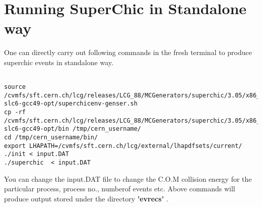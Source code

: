 \documentclass[11pt]{article}
\begin{document}
\section{Running SuperChic in Standalone way}

One can directly carry out following commands in the fresh terminal to produce superchic events in standalone way.

\begin{tiny}
\begin{verbatim}

source /cvmfs/sft.cern.ch/lcg/releases/LCG_88/MCGenerators/superchic/3.05/x86_64-slc6-gcc49-opt/superchicenv-genser.sh
cp -rf /cvmfs/sft.cern.ch/lcg/releases/LCG_88/MCGenerators/superchic/3.05/x86_64-slc6-gcc49-opt/bin /tmp/cern_username/
cd /tmp/cern_username/bin/
export LHAPATH=/cvmfs/sft.cern.ch/lcg/external/lhapdfsets/current/
./init < input.DAT
./superchic  < input.DAT

\end{verbatim}
\end{tiny}


You can change the input.DAT file to change the C.O.M collision energy for the particular process, process no., numberof events etc. Above commands will produce output stored under the directory {\bf  'evrecs' }.
\end{document}
